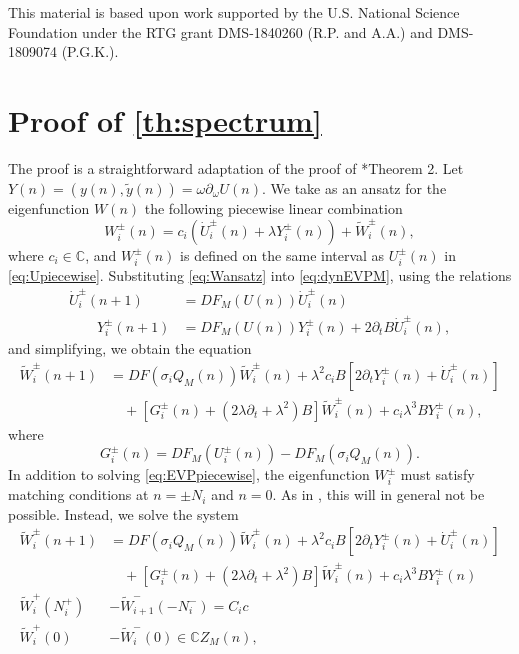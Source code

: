 \documentclass[12pt,reqno]{amsart}
\def\C{{\mathbb C}}
\theoremstyle{definition}
\begin{document}
This material is based upon work supported by the U.S. National Science Foundation under the RTG grant DMS-1840260 (R.P. and A.A.)
and DMS-1809074 (P.G.K.).

\appendix

\section{Proof of \texorpdfstring{\cref{th:spectrum}}{Theorem 2} }\label{app:specproof}

The proof is a straightforward adaptation of the proof of \cite{Parker2020}*{Theorem 2}. Let $Y(n) = (y(n), \tilde{y}(n)) = \omega \partial_\omega U(n)$. We take as an ansatz for the eigenfunction $W(n)$ the following piecewise linear combination
\begin{equation}\label{eq:Wansatz}
W_i^\pm(n) = c_i ( \dot{U}_i^\pm(n) + \lambda Y_i^\pm(n) ) + \tilde{W}_i^\pm(n),
\end{equation}
where $c_i \in \C$, and $W_i^\pm(n)$ is defined on the same interval as $U_i^\pm(n)$ in \cref{eq:Upiecewise}. Substituting \cref{eq:Wansatz} into \cref{eq:dynEVPM}, using the relations
\begin{equation}
\begin{aligned}
\dot{U}_i^\pm(n+1) &= DF_M(U(n))\dot{U}_i^\pm(n) \\ 
\qquad Y_i^\pm(n+1) &= DF_M(U(n)) Y_i^\pm(n) + 2 \partial_t B \dot{U}_i^\pm(n),
\end{aligned}
\end{equation}
and simplifying, we obtain the equation
\begin{equation}\label{eq:EVPpiecewise}
\begin{aligned}
\tilde{W}_i^\pm(n+1) &= DF(\sigma_i Q_M(n)) \tilde{W}_i^\pm(n) + \lambda^2 c_i B[ 2 \partial_t Y_i^\pm(n) + \dot{U}_i^\pm(n)] \\
&\quad+ [G_i^\pm(n) + (2 \lambda \partial_t + \lambda^2) B] \tilde{W}_i^\pm(n) + c_i \lambda^3 B Y_i^\pm(n),
\end{aligned}
\end{equation}
where
\begin{equation}\label{eq:Gipm}
G_i^\pm(n) = DF_M(U_i^\pm(n)) - DF_M(\sigma_i Q_M(n)).
\end{equation}
In addition to solving \cref{eq:EVPpiecewise}, the eigenfunction $W_i^\pm$ must satisfy matching conditions at $n = \pm N_i$ and $n = 0$. As in \cites{Parker2020,Parker2021,Sandstede1998}, this will in general not be possible. Instead, we solve the system 
\begin{equation}\label{eq:EVPsystem}
\begin{aligned}
\tilde{W}_i^\pm(n+1) &= DF(\sigma_i Q_M(n)) \tilde{W}_i^\pm(n) + \lambda^2 c_i B[ 2 \partial_t Y_i^\pm(n) + \dot{U}_i^\pm(n)] \\
&\quad+ [G_i^\pm(n) + (2 \lambda \partial_t + \lambda^2) B] \tilde{W}_i^\pm(n) + c_i \lambda^3 B Y_i^\pm(n) \\
\tilde{W}_i^+(N_i^+) &- \tilde{W}_{i+1}^-(-N_i^-) = C_i c \\
\tilde{W}_i^+(0) &- \tilde{W}_i^-(0) \in \C Z_M(n),
\end{aligned}
\end{equation}
\end{document}
